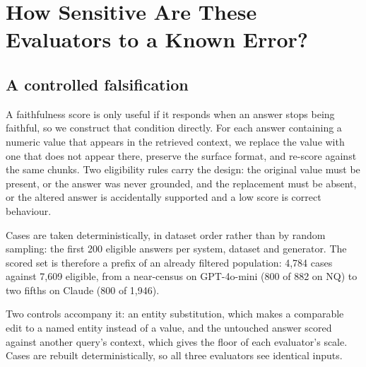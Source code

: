 \documentclass[11pt]{article}
\begin{document}
\section{How Sensitive Are These Evaluators to a Known Error?}
\label{sec:sensitivity}


\subsection{A controlled falsification}
\label{sec:falsification}

A faithfulness score is only useful if it responds when an answer stops being faithful, so we construct that condition directly. For each answer containing a numeric value that appears in the retrieved context, we replace the value with one that does not appear there, preserve the surface format, and re-score against the same chunks. Two eligibility rules carry the design: the original value must be present, or the answer was never grounded, and the replacement must be absent, or the altered answer is accidentally supported and a low score is correct behaviour.

Cases are taken deterministically, in dataset order rather than by random sampling: the first 200 eligible answers per system, dataset and generator. The scored set is therefore a prefix of an already filtered population: 4,784 cases against 7,609 eligible, from a near-census on GPT-4o-mini (800 of 882 on NQ) to two fifths on Claude (800 of 1,946).

Two controls accompany it: an entity substitution, which makes a comparable edit to a named entity instead of a value, and the untouched answer scored against another query's context, which gives the floor of each evaluator's scale. Cases are rebuilt deterministically, so all three evaluators see identical inputs.
\end{document}
